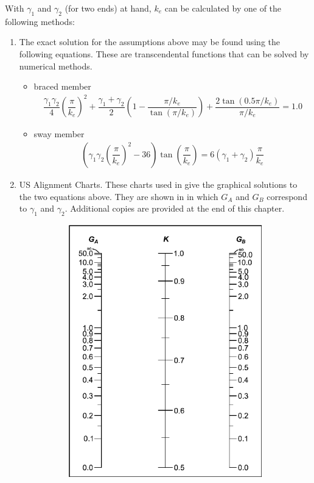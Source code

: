 With $\gamma_1$ and $\gamma_2$ (for two ends) at hand, $k_e$ can be calculated by one of the following methods:
\begin{enumerate}
\item The exact solution for the assumptions above may be found using the following equations. These are transcendental functions that can be solved by numerical methods.
\begin{itemize}
\item braced member
\begin{gather*}
\dfrac{\gamma_1\gamma_2}{4}\left(\dfrac{\pi}{k_e}\right)^2+\dfrac{\gamma_1+\gamma_2}{2}\left(1-\dfrac{\pi/k_e}{\tan\left(\pi/k_e\right)}\right)+\dfrac{2\tan\left(0.5\pi/k_e\right)}{\pi/k_e}=1.0
\end{gather*}
\item sway member
\begin{gather*}
\left(\gamma_1\gamma_2\left(\dfrac{\pi}{k_e}\right)^2-36\right)\tan\left(\dfrac{\pi}{k_e}\right)=6\left(\gamma_1+\gamma_2\right)\dfrac{\pi}{k_e}
\end{gather*}
\end{itemize}
\item US Alignment Charts. These charts used in \ANSI{} give the graphical solutions to the two equations above. They are shown in  in which $G_A$ and $G_B$ correspond to $\gamma_1$ and $\gamma_2$. Additional copies are provided at the end of this chapter.
\begin{figure}[htb!]
\centering\footnotesize
\begin{subfigure}{.5\linewidth}\centering
\includegraphics[width=.9\linewidth]{PIC/CH04/A360.BRACED}

\end{subfigure}
\end{figure}
\end{enumerate}
